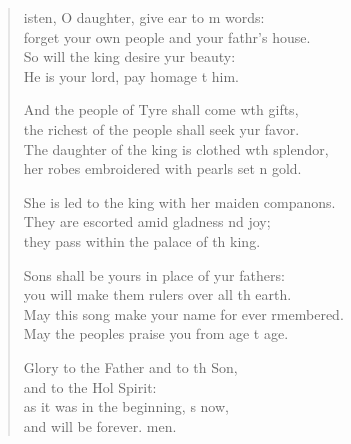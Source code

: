 \settowidth{\versewidth}{The daughter of the king is clothed with splendor, *}
\begin{verse}%
  \begin{patverse}
isten, O daughter, give ear to m words:\Med\\
forget your own people and your fathr’s house.\\
So will the king desire yur beauty:\Med\\
He is your lord, pay homage t him.

And the people of Tyre shall come w\pointup{\i}th gifts,\Med\\
the richest of the people shall seek yur favor.\\
The daughter of the king is clothed w\pointup{\i}th splendor,\Med\\
her robes embroidered with pearls set \pointup{\i}n gold.

She is led to the king with her maiden compan\pointup{\i}ons.\Flex\\
They are escorted amid gladness nd joy;\Med\\
they pass within the palace of th king.

Sons shall be yours in place of yur fathers:\Med\\
you will make them rulers over all th earth.\\
May this song make your name for ever rmembered.\Med\\
May the peoples praise you from age t age.

Glory to the Father and to th Son,\Med\\
and to the Hol Spirit:\\
as it was in the beginning, \pointup{\i}s now,\Med\\
and will be forever. men. 
  \end{patverse}
\end{verse}
